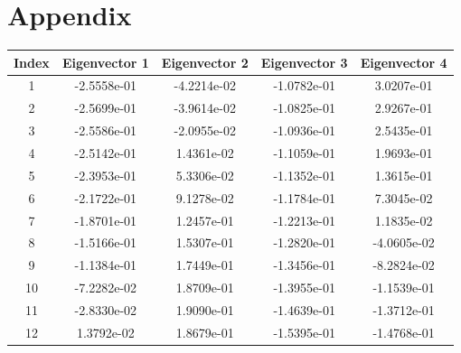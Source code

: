 \documentclass{article}
\begin{document}
\section{Appendix}

\begin{table}[h!]                                              
\centering                                                  
\begin{tabular}{|c|c|c|c|c|}                                
\hline
Index & Eigenvector 1 & Eigenvector 2 & Eigenvector 3 & Eigenvector 4 \\
\hline                                                      
1 & -2.5558e-01 & -4.2214e-02 & -1.0782e-01 & 3.0207e-01 \\ 
\hline                                                      
2 & -2.5699e-01 & -3.9614e-02 & -1.0825e-01 & 2.9267e-01 \\ 
\hline                                                      
3 & -2.5586e-01 & -2.0955e-02 & -1.0936e-01 & 2.5435e-01 \\ 
\hline                                                      
4 & -2.5142e-01 & 1.4361e-02 & -1.1059e-01 & 1.9693e-01 \\  
\hline                                                      
5 & -2.3953e-01 & 5.3306e-02 & -1.1352e-01 & 1.3615e-01 \\  
\hline                                                      
6 & -2.1722e-01 & 9.1278e-02 & -1.1784e-01 & 7.3045e-02 \\  
\hline                                                      
7 & -1.8701e-01 & 1.2457e-01 & -1.2213e-01 & 1.1835e-02 \\  
\hline                                                      
8 & -1.5166e-01 & 1.5307e-01 & -1.2820e-01 & -4.0605e-02 \\ 
\hline                                                      
9 & -1.1384e-01 & 1.7449e-01 & -1.3456e-01 & -8.2824e-02 \\ 
\hline                                                      
10 & -7.2282e-02 & 1.8709e-01 & -1.3955e-01 & -1.1539e-01 \\
\hline                                                      
11 & -2.8330e-02 & 1.9090e-01 & -1.4639e-01 & -1.3712e-01 \\
\hline                                                      
12 & 1.3792e-02 & 1.8679e-01 & -1.5395e-01 & -1.4768e-01 \\ 
\hline                                                      

\end{tabular}
\end{table}
\end{document}
